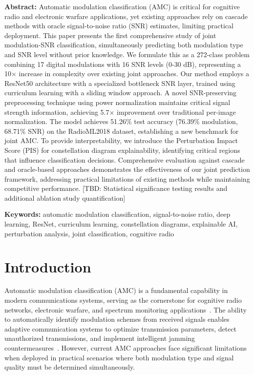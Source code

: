 \documentclass{ELSP}
\begin{document}
\noindent\textbf{\textbf{\textcolor[RGB]{0,131,255}{Abstract:}}} Automatic modulation classification (AMC) is critical for cognitive radio and electronic warfare applications, yet existing approaches rely on cascade methods with oracle signal-to-noise ratio (SNR) estimates, limiting practical deployment. This paper presents the first comprehensive study of joint modulation-SNR classification, simultaneously predicting both modulation type and SNR level without prior knowledge. We formulate this as a 272-class problem combining 17 digital modulations with 16 SNR levels (0-30 dB), representing a 10× increase in complexity over existing joint approaches. Our method employs a ResNet50 architecture with a specialized bottleneck SNR layer, trained using curriculum learning with a sliding window approach. A novel SNR-preserving preprocessing technique using power normalization maintains critical signal strength information, achieving 5.7× improvement over traditional per-image normalization. The model achieves 51.26\% test accuracy (76.39\% modulation, 68.71\% SNR) on the RadioML2018 dataset, establishing a new benchmark for joint AMC. To provide interpretability, we introduce the Perturbation Impact Score (PIS) for constellation diagram explainability, identifying critical regions that influence classification decisions. Comprehensive evaluation against cascade and oracle-based approaches demonstrates the effectiveness of our joint prediction framework, addressing practical limitations of existing methods while maintaining competitive performance. [TBD: Statistical significance testing results and additional ablation study quantification]

\noindent\textbf{\textcolor[RGB]{0,131,255}{Keywords:}} automatic modulation classification, signal-to-noise ratio, deep learning, ResNet, curriculum learning, constellation diagrams, explainable AI, perturbation analysis, joint classification, cognitive radio 


\section{Introduction}

Automatic modulation classification (AMC) is a fundamental capability in modern communications systems, serving as the cornerstone for cognitive radio networks, electronic warfare, and spectrum monitoring applications~\cite{oshea2017introduction,dobre2007survey}. The ability to automatically identify modulation schemes from received signals enables adaptive communication systems to optimize transmission parameters, detect unauthorized transmissions, and implement intelligent jamming countermeasures~\cite{west2017deep,liu2020survey}. However, current AMC approaches face significant limitations when deployed in practical scenarios where both modulation type and signal quality must be determined simultaneously.
\end{document}
